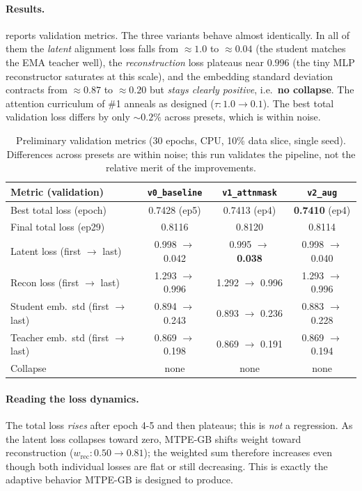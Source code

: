 \documentclass[11pt]{article}
\newcommand{\wrec}{w_{\mathrm{rec}}}
\begin{document}
\paragraph{Results.}  reports validation metrics. The three
variants behave almost identically. In all of them the \emph{latent} alignment
loss falls from \(\approx\!1.0\) to \(\approx\!0.04\) (the student matches the EMA
teacher well), the \emph{reconstruction} loss plateaus near \(0.996\) (the tiny
MLP reconstructor saturates at this scale), and the embedding standard deviation
contracts from \(\approx\!0.87\) to \(\approx\!0.20\) but \emph{stays clearly
positive}, i.e.\ \textbf{no collapse}. The attention curriculum of \#1 anneals
as designed (\(\tau:1.0\!\to\!0.1\)). The best total validation loss differs by
only \(\sim\!0.2\%\) across presets, which is within noise.

\begin{table}[t]
\centering
\caption{Preliminary validation metrics (30 epochs, CPU, 10\% data slice, single
seed). Differences across presets are within noise; this run validates the
pipeline, not the relative merit of the improvements.}
\label{tab:results}
\small
\begin{tabular}{lccc}
\toprule
Metric (validation) & \texttt{v0\_baseline} & \texttt{v1\_attnmask} & \texttt{v2\_aug} \\
\midrule
Best total loss (epoch)      & 0.7428 (ep5) & 0.7413 (ep4) & \textbf{0.7410} (ep4) \\
Final total loss (ep29)      & 0.8116 & 0.8120 & 0.8114 \\
Latent loss (first $\to$ last) & 0.998 $\to$ 0.042 & 0.995 $\to$ \textbf{0.038} & 0.998 $\to$ 0.040 \\
Recon loss (first $\to$ last)  & 1.293 $\to$ 0.996 & 1.292 $\to$ 0.996 & 1.293 $\to$ 0.996 \\
Student emb.\ std (first $\to$ last) & 0.894 $\to$ 0.243 & 0.893 $\to$ 0.236 & 0.883 $\to$ 0.228 \\
Teacher emb.\ std (first $\to$ last) & 0.869 $\to$ 0.198 & 0.869 $\to$ 0.191 & 0.869 $\to$ 0.194 \\
Collapse & none & none & none \\
\bottomrule
\end{tabular}
\end{table}

\paragraph{Reading the loss dynamics.} The total loss \emph{rises} after epoch
4-5 and then plateaus; this is \emph{not} a regression. As the latent loss
collapses toward zero, MTPE-GB shifts weight toward reconstruction
(\(\wrec:0.50\!\to\!0.81\)); the weighted sum therefore increases even though both
individual losses are flat or still decreasing. This is exactly the adaptive
behavior MTPE-GB is designed to produce.
\end{document}
